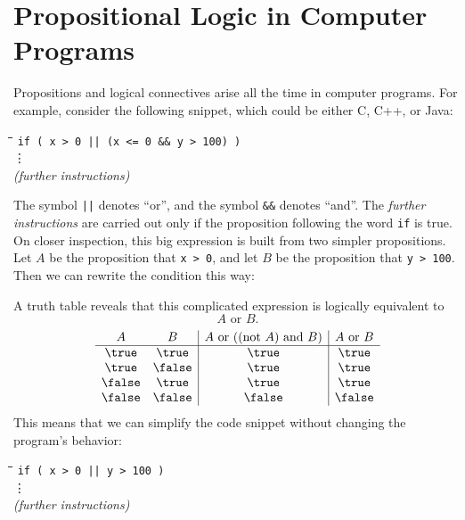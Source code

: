 \begin{problems}

\classproblems
{}

\homeworkproblems
{}
\end{problems}

\section{Propositional Logic in Computer Programs}

Propositions and logical connectives arise all the time in computer
programs.  For example, consider the following snippet, which could be
either C, C++, or Java:
%
\begin{tabbing}
\hspace{1in} \= \quad\quad \= \quad\quad \= \quad\quad \= \kill
\> \texttt{if ( x > 0 || (x <= 0 \&\& y > 100) )} \\
\> \> \vdots\\
\> \textit{(further instructions)}
\end{tabbing}
%
The symbol \texttt{||} denotes ``or'', and the symbol \texttt{\&\&}
denotes ``and''.  The \textit{further instructions} are carried out
only if the proposition following the word \texttt{if} is true.  On
closer inspection, this big expression is built from two simpler
propositions.  Let $A$ be the proposition that \texttt{x > 0}, and let
$B$ be the proposition that \texttt{y > 100}.  Then we can rewrite the
condition this way:
%
%
A truth table reveals that this complicated expression is logically
equivalent to 
\begin{equation}\label{AOB}
A \text{ or } B.
\end{equation}
%
\[
\begin{array}{cc|c|c}
A & B &
    A \text{ or } ((\text{not } A) \text{ and } B) &
    A \text{ or } B \\ \hline
\true & \true & \true & \true \\
\true & \false & \true & \true \\
\false & \true & \true & \true \\
\false & \false & \false & \false
\end{array}
\]
%
This means that we can simplify the code snippet without changing the
program's behavior:
%
\begin{tabbing}
\hspace{1in} \= \quad\quad \= \quad\quad \= \quad\quad \= \kill
\> \texttt{if ( x > 0 || y > 100 )} \\
\> \> \vdots\\
\> \textit{(further instructions)}
\end{tabbing}

